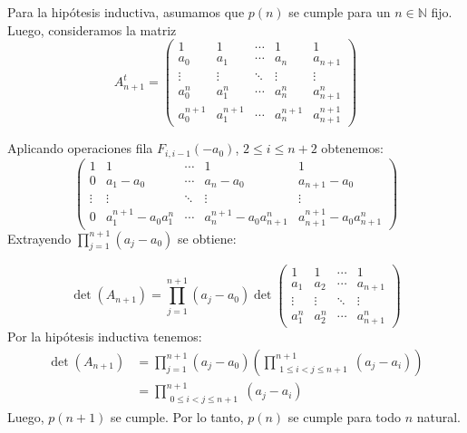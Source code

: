 \begin{frame}
\begin{solution}
		Para la hipótesis inductiva, asumamos que $p\left(n\right)$ se
		cumple para un $n\in\mathbb{N}$ fijo.
        Luego, consideramos la matriz $$A^{t}_{n+1}=\begin{pmatrix} 1&1&\cdots & 1 &1\\a_0&a_1&\cdots &a_{n}&a_{n+1}\\\vdots&\vdots&\ddots&\vdots&\vdots\\a_0^{n}&a_1^{n}&\cdots&a_{n}^{n}& a_{n+1}^{n}\\a_0^{n+1}&a_1^{n+1}&\cdots&a_{n}^{n+1}&a_{n+1}^{n+1}\end{pmatrix}$$
        \end{solution}
    \end{frame}
    \begin{frame}
    Aplicando operaciones fila $F_{i,i-1}(-a_{0})$, $2\leq i\leq n+2$ obtenemos:
     $$\begin{pmatrix} 1&1&\cdots & 1 &1\\   0&a_1-a_0&\cdots &a_n-a_0&a_{n+1}-a_0\\   \vdots&\vdots&\ddots&\vdots&\vdots\\   0&a_1^{n+1}-a_0a_{1}^{n}&\cdots&a_{n}^{n+1}-a_0a_{n+1}^{n}& a_{n+1}^{n+1}-a_0a_{n+1}^{n}\end{pmatrix}$$
    Extrayendo $\prod_{j=1}^{n+1}(a_j-a_0)$ se obtiene:
    
    $$\det\left(A_{n+1}\right)=\prod_{j=1}^{n+1}(a_j-a_0) \det\begin{pmatrix} 1& 1&\cdots&1\\a_1&a_2&\cdots&a_{n+1}\\ \vdots&\vdots&\ddots&\vdots\\a_1^{n}&a_2^{n}&\cdots&a_{n+1}^{n}\end{pmatrix}$$
    Por la hipótesis inductiva tenemos:
    \begin{align*}
        \det\left(A_{n+1}\right)&=\prod_{j=1}^{n+1}(a_j-a_0)(\prod\limits_{\substack{1\leq i< j\leq n+1}}^{n+1}
			      \left(a_{j}-a_{i}\right))\\
         &=\prod\limits_{\substack{0\leq i< j\leq n+1}}^{n+1}
			      \left(a_{j}-a_{i}\right)
    \end{align*}
		Luego, $p\left(n+1\right)$ se cumple.
		Por lo tanto, $p\left(n\right)$ se cumple para todo $n$ natural.
	
\end{frame}
